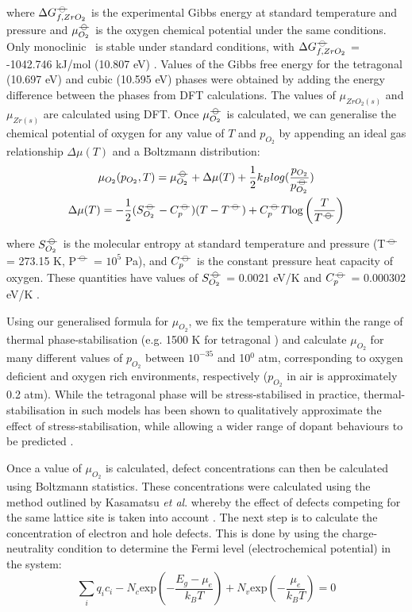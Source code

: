 where $\Delta{G^{{\ensuremath{-\kern-4pt{\ominus}\kern-4pt-}}}_{f, ZrO_2}}$ is the experimental Gibbs energy at standard temperature and pressure and $\mu^{{-\kern-4pt{\ominus}\kern-4pt-}}_{O_2}$ is the oxygen chemical potential under the same conditions. Only monoclinic \zirconia\ is stable under standard conditions, with $\Delta{G^{{\ensuremath{-\kern-4pt{\ominus}\kern-4pt-}}}_{f, ZrO_2}}$ = -1042.746 kJ/mol (10.807 eV) \cite{brown2005chemical}. Values of the Gibbs free energy for the tetragonal (10.697 eV) and cubic (10.595 eV) phases were obtained by adding the energy difference between the phases from DFT calculations. The values of $\mu_{ZrO_2(s)}$ and $\mu_{Zr(s)}$ are calculated using DFT. Once $\mu^{{-\kern-4pt{\ominus}\kern-4pt-}}_{O_2}$ is calculated, we can generalise the chemical potential of oxygen for any value of $T$ and $p_{O_2}$ by appending an ideal gas relationship $\Delta{\mu(T)}$ and a Boltzmann distribution:
\begin{gather}
\mu_{O_2}(p_{O_2},T) = \mu^{\plimsoll}_{O_2} + \Delta{\mu(T)} + \frac{1}{2}{k_B}log(\frac{p_{O_2}}{p^{\plimsoll}_{O_2}}) \\
\Delta \mu(T) = -\frac{1}{2}(S^{\plimsoll}_{O_{2}}- C^{\plimsoll}_{p})(T-T^{\plimsoll}) + C^{\plimsoll}_{p}T\textup{log}\left ( \frac{T}{T^{\plimsoll}} \right )
\end{gather} 

where $S^{{-\kern-4pt{\ominus}\kern-4pt-}}_{O_{2}}$ is the molecular entropy at standard temperature and pressure (T$^{{-\kern-4pt{\ominus}\kern-4pt-}}$ = 273.15 K, P$^{{-\kern-4pt{\ominus}\kern-4pt-}}$ = $10^{5}$ Pa), and $C^{{-\kern-4pt{\ominus}\kern-4pt-}}_{p}$ is the constant pressure heat capacity of oxygen. These quantities have values of $S^{{-\kern-4pt{\ominus}\kern-4pt-}}_{O_{2}}$ = 0.0021 eV/K and $C^{{-\kern-4pt{\ominus}\kern-4pt-}}_{p}$ = 0.000302 eV/K \cite{weast1984crc}. 

Using our generalised formula for $\mu_{O_2}$, we fix the temperature within the range of thermal phase-stabilisation (e.g. 1500 K for tetragonal \zirconia) and calculate $\mu_{O_2}$ for many different values of $p_{O_2}$ between $10^{-35}$ and 10$^{0}$ atm, corresponding to oxygen deficient and oxygen rich environments, respectively ($p_{O_2}$ in air is approximately 0.2 atm). While the tetragonal phase will be stress-stabilised in practice, thermal-stabilisation in such models has been shown to qualitatively approximate the effect of stress-stabilisation, while allowing a wider range of dopant behaviours to be predicted \cite{Bell2016}. 

Once a value of $\mu_{O_2}$ is calculated, defect concentrations can then be calculated using Boltzmann statistics. These concentrations were calculated using the method outlined by Kasamatsu \emph{et al}. whereby the effect of defects competing for the same lattice site is taken into account \cite{Kasamatsu2012}. The next step is to calculate the concentration of electron and hole defects. This is done by using the charge-neutrality condition to determine the Fermi level (electrochemical potential) in the system:
\begin{equation}
\sum_{i}q_{i}c_{i} - N_{c}\textrm{exp}{(-\frac{E_{g}-\mu_{e}}{k_{B}T})} + N_{v}\textrm{exp}{(-\frac{\mu_{e}}{k_{B}T})} = 0
\label{charge_neutrality}
\end{equation}


